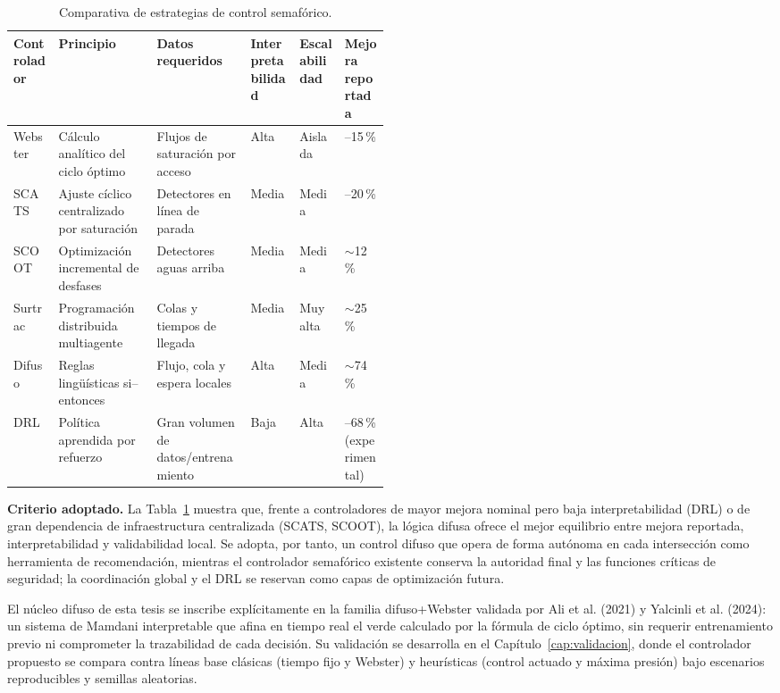 \begin{table}[H]
  \centering
  \footnotesize
  \caption{Comparativa de estrategias de control semafórico.}
  \label{tab:control}
  \begin{tabularx}{\linewidth}{@{}>{\raggedright\arraybackslash}p{0.12\linewidth}XX>{\raggedright\arraybackslash}p{0.13\linewidth}>{\raggedright\arraybackslash}p{0.12\linewidth}>{\raggedright\arraybackslash}p{0.12\linewidth}@{}}
    \toprule
    \textbf{Controlador} & \textbf{Principio} & \textbf{Datos requeridos} & \textbf{Interpre\-tabilidad} & \textbf{Escala\-bilidad} & \textbf{Mejora reportada} \\
    \midrule
    Webster & Cálculo analítico del ciclo óptimo & Flujos de saturación por acceso & Alta & Aislada & 10--15\,\% \\
    SCATS & Ajuste cíclico centralizado por saturación & Detectores en línea de parada & Media & Media & 12--20\,\% \\
    SCOOT & Optimización incremental de desfases & Detectores aguas arriba & Media & Media & $\sim$12\,\% \\
    Surtrac & Programación distribuida multiagente & Colas y tiempos de llegada & Media & Muy alta & $\sim$25\,\% \\
    Difuso & Reglas lingüísticas si--entonces & Flujo, cola y espera locales & Alta & Media & $\sim$74\,\% \\
    DRL & Política aprendida por refuerzo & Gran volumen de datos/entrenamiento & Baja & Alta & 27--68\,\% (experimental) \\
    \bottomrule
  \end{tabularx}
\end{table}

\textbf{Criterio adoptado.} La Tabla~\ref{tab:control} muestra que, frente a controladores de mayor mejora
nominal pero baja interpretabilidad (DRL) o de gran dependencia de infraestructura centralizada (SCATS,
SCOOT), la lógica difusa ofrece el mejor equilibrio entre mejora reportada, interpretabilidad y validabilidad
local. Se adopta, por tanto, un control difuso que opera de forma autónoma en cada intersección como
herramienta de recomendación, mientras el controlador semafórico existente conserva la autoridad final y las
funciones críticas de seguridad; la coordinación global y el DRL se reservan como capas de optimización
futura.

El núcleo difuso de esta tesis se inscribe explícitamente en la familia difuso+Webster validada por Ali et
al. (2021) y Yalcinli et al. (2024): un sistema de Mamdani interpretable que afina en tiempo real el verde
calculado por la fórmula de ciclo óptimo, sin requerir entrenamiento previo ni comprometer la trazabilidad de
cada decisión. Su validación se desarrolla en el Capítulo~\ref{cap:validacion}, donde el controlador propuesto
se compara contra líneas base clásicas (tiempo fijo y Webster) y heurísticas (control actuado y máxima
presión) bajo escenarios reproducibles y semillas aleatorias.

